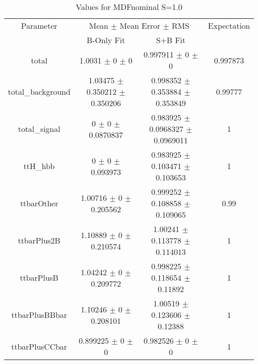 \begin{table}
\centering
\caption{Values for MDFnominal S=1.0}
\begin{tabular}{cccc}
\toprule
Parameter & \multicolumn{2}{c}{Mean $\pm$ Mean Error $\pm$ RMS} & Expectation\\
 & B-Only Fit & S+B Fit & \\
\midrule
total & \num{1.0031} $\pm$ \num{0} $\pm$ \num{0} & \num{0.997911} $\pm$ \num{0} $\pm$ \num{0} & \num{0.997873}\\
total\_background & \num{1.03475} $\pm$ \num{0.350212} $\pm$ \num{0.350206} & \num{0.998352} $\pm$ \num{0.353884} $\pm$ \num{0.353849} & \num{0.99777}\\
total\_signal & \num{0} $\pm$ \num{0} $\pm$ \num{0.0870837} & \num{0.983925} $\pm$ \num{0.0968327} $\pm$ \num{0.0969011} & \num{1}\\
ttH\_hbb & \num{0} $\pm$ \num{0} $\pm$ \num{0.093973} & \num{0.983925} $\pm$ \num{0.103471} $\pm$ \num{0.103653} & \num{1}\\
ttbarOther & \num{1.00716} $\pm$ \num{0} $\pm$ \num{0.205562} & \num{0.999252} $\pm$ \num{0.108858} $\pm$ \num{0.109065} & \num{0.99}\\
ttbarPlus2B & \num{1.10889} $\pm$ \num{0} $\pm$ \num{0.210574} & \num{1.00241} $\pm$ \num{0.113778} $\pm$ \num{0.114013} & \num{1}\\
ttbarPlusB & \num{1.04242} $\pm$ \num{0} $\pm$ \num{0.209772} & \num{0.998225} $\pm$ \num{0.118654} $\pm$ \num{0.11892} & \num{1}\\
ttbarPlusBBbar & \num{1.10246} $\pm$ \num{0} $\pm$ \num{0.208101} & \num{1.00519} $\pm$ \num{0.123606} $\pm$ \num{0.12388} & \num{1}\\
ttbarPlusCCbar & \num{0.899225} $\pm$ \num{0} $\pm$ \num{0} & \num{0.982526} $\pm$ \num{0} $\pm$ \num{0} & \num{1}\\
\bottomrule
\end{tabular}
\end{table}